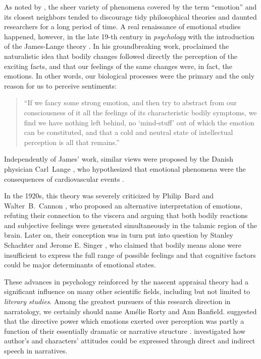 As noted by \citet{Sousa:14}, the sheer variety of phenomena covered
by the term ``emotion'' and its closest neighbors tended to discourage
tidy philosophical theories and daunted researchers for a long period
of time.  A real renaissance of emotional studies happened, however,
in the late 19-th century in \emph{psychology} with the introduction
of the James-Lange theory \citep{James:1884}.  In his groundbreaking
work, \citeauthor{James:1884} proclaimed the naturalistic idea that
bodily changes followed directly the perception of the exciting facts,
and that our feelings of the same changes were, in fact, the emotions.
In other words, our biological processes were the primary and the only
reason for us to perceive sentiments:
\begin{quote}
``If we fancy some strong emotion, and then try to abstract from our
  consciousness of it all the feelings of its characteristic bodily
  symptoms, we find we have nothing left behind, no `mind-stuff' out
  of which the emotion can be constituted, and that a cold and neutral
  state of intellectual perception is all that
  remains.''\citep[p. 193]{James:1884}
\end{quote}
Independently of James' work, similar views were proposed by the
Danish physician Carl~Lange \citep{Lange:1885}, who hypothesized that
emotional phenomena were the consequences of cardiovascular events
\citep[cf.][]{Lang:94}.

In the 1920s, this theory was severely criticized by Philip~Bard and
Walter~B.~Cannon \citep{Bard:28,Cannon:31}, who proposed an
alternative interpretation of emotions, refuting their connection to
the viscera and arguing that both bodily reactions and subjective
feelings were generated simultaneously in the talamic region of the
brain.  Later on, their conception was in turn put into question by
Stanley Schachter and Jerome E. Singer \citep{Schachter:62}, who
claimed that bodily means alone were insufficient to express the full
range of possible feelings and that cognitive factors could be major
determinants of emotional states. %

These advances in psychology reinforced by the nascent appraisal
theory \citep{Arnold:60} had a significant influence on many other
scientific fields, including but not limited to \emph{literary
  studies}.  Among the greatest pursuers of this research direction in
narratology, we certainly should name Am\'elie Rorty and Ann Banfield.
\citet{Rorty:80} suggested that the directive power which emotions
exerted over perception was partly a function of their essentially
dramatic or narrative structure \citep[cf.][]{Sousa:14}.
\citet{Banfield:82} investigated how author's and characters'
attitudes could be expressed through direct and indirect speech in
narratives.

